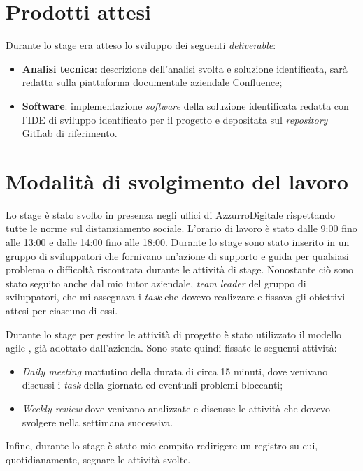\section{Prodotti attesi}
\label{cap:prodotti}
Durante lo stage era atteso lo sviluppo dei seguenti \emph{deliverable}:
\begin{itemize}
	\item \textbf{Analisi tecnica}: descrizione dell’analisi svolta e soluzione identificata, sarà redatta sulla piattaforma documentale aziendale Confluence;
	\item \textbf{Software}: implementazione \emph{software} della soluzione identificata redatta con l’IDE di sviluppo identificato per il progetto e depositata sul \emph{repository} GitLab di riferimento.
\end{itemize}

\section{Modalità di svolgimento del lavoro}
Lo stage è stato svolto in presenza negli uffici di AzzurroDigitale rispettando tutte le norme sul distanziamento sociale. L'orario di lavoro è stato dalle 9:00 fino alle 13:00 e dalle 14:00 fino alle 18:00. Durante lo stage sono stato inserito in un gruppo di sviluppatori che fornivano un'azione di supporto e guida per qualsiasi problema o difficoltà riscontrata durante le attività di stage. Nonostante ciò sono stato seguito anche dal mio tutor aziendale, \emph{team leader} del gruppo di sviluppatori, che mi assegnava i \emph{task} che dovevo realizzare e fissava gli obiettivi attesi per ciascuno di essi. 

Durante lo stage per gestire le attività di progetto è stato utilizzato il modello agile , già adottato dall'azienda. Sono state quindi fissate le seguenti attività:
\begin{itemize}
	\item \emph{Daily meeting} mattutino della durata di circa 15 minuti, dove venivano discussi i \emph{task} della giornata ed eventuali problemi bloccanti;
	\item \emph{Weekly review} dove venivano analizzate e discusse le attività che dovevo svolgere nella settimana successiva.
\end{itemize}

Infine, durante lo stage è stato mio compito redirigere un registro su cui, quotidianamente, segnare le attività svolte.

